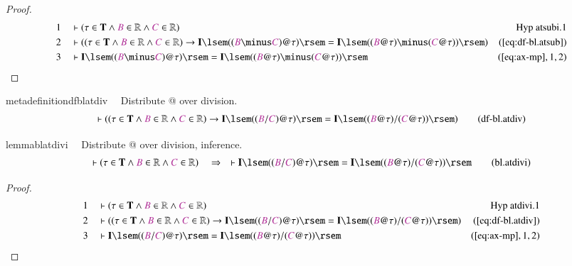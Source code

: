 \begin{proof}
\begin{align}
  1 &&  & \vdash ( \tau \in \mathbf{T} \wedge \mc{B} \in \mathbb{R} \wedge
      \mc{C} \in \mathbb{R}
      )&\text{Hyp~atsubi.1}\notag%
  \\ 2 &&  & \vdash ( ( \tau \in \mathbf{T} \wedge \mc{B} \in \mathbb{R} \wedge
      \mc{C} \in \mathbb{R} ) \rightarrow \mathbf{I} \lsem
      ( ( \mc{B} \minus \mc{C} ) @ \tau ) \rsem =
      \mathbf{I} \lsem ( ( \mc{B} @ \tau ) \minus ( \mc{C}
      @ \tau ) ) \rsem
      )&(\mbox{\ref{eq:df-bl.atsub}})\notag
  \\ 3 &&  & \vdash \mathbf{I} \lsem ( ( \mc{B} \minus \mc{C} ) @ \tau ) \rsem
      = \mathbf{I} \lsem ( ( \mc{B} @ \tau ) \minus (
      \mc{C} @ \tau ) )
      \rsem&(\mbox{\ref{eq:ax-mp}},1,2)\notag
\end{align}
\end{proof}

\begin{restatable}{metadefinition}{dfblatdiv}~~ Distribute @ over division.
\begin{align}
\vdash ( ( \tau \in \mathbf{T} \wedge \mc{B} \in \mathbb{R} \wedge \mc{C} \in
    \mathbb{R} ) \rightarrow \mathbf{I} \lsem ( ( \mc{B} / \mc{C} ) @ \tau )
    \rsem = \mathbf{I} \lsem ( ( \mc{B} @ \tau ) / ( \mc{C} @ \tau ) ) \rsem
    )\label{eq:df-bl.atdiv}\tag{df-bl.atdiv}
\end{align}
\end{restatable}

\begin{restatable}{lemma}{blatdivi}~~ Distribute @ over division, inference.
\begin{align}
\vdash ( \tau \in \mathbf{T} \wedge \mc{B} \in \mathbb{R} \wedge \mc{C} \in
    \mathbb{R} )\quad\Rightarrow\quad \vdash \mathbf{I} \lsem ( ( \mc{B} /
    \mc{C} ) @ \tau ) \rsem = \mathbf{I} \lsem ( ( \mc{B} @ \tau ) / ( \mc{C} @
    \tau ) ) \rsem\label{eq:bl.atdivi}\tag{bl.atdivi}
\end{align}
\end{restatable}

\begin{proof}
\begin{align}
  1 &&  & \vdash ( \tau \in \mathbf{T} \wedge \mc{B} \in \mathbb{R} \wedge
      \mc{C} \in \mathbb{R}
      )&\text{Hyp~atdivi.1}\notag%
  \\ 2 &&  & \vdash ( ( \tau \in \mathbf{T} \wedge \mc{B} \in \mathbb{R} \wedge
      \mc{C} \in \mathbb{R} ) \rightarrow \mathbf{I} \lsem
      ( ( \mc{B} / \mc{C} ) @ \tau ) \rsem = \mathbf{I}
      \lsem ( ( \mc{B} @ \tau ) / ( \mc{C} @ \tau ) ) \rsem
      )&(\mbox{\ref{eq:df-bl.atdiv}})\notag
  \\ 3 &&  & \vdash \mathbf{I} \lsem ( ( \mc{B} / \mc{C} ) @ \tau ) \rsem =
      \mathbf{I} \lsem ( ( \mc{B} @ \tau ) / ( \mc{C} @
      \tau ) ) \rsem&(\mbox{\ref{eq:ax-mp}},1,2)\notag
\end{align}
\end{proof}

